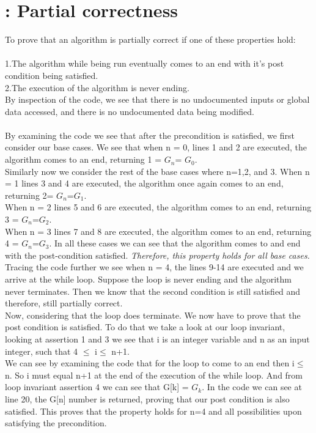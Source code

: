\documentclass{article}
\begin{document}
    \section{: Partial correctness}
    To prove that an algorithm is partially correct if one of these properties hold:\\
    \\1.The algorithm while being run eventually comes to an end with it’s post condition being satisfied.\\
    2.The execution of the algorithm is never ending. \\
    By inspection of the code, we see that there is no undocumented inputs or global data accessed, and there is no undocumented data being modified.\\
    \\By examining the code we see that after the precondition is satisfied, we first consider our base cases. We see that when n = 0, lines 1 and 2 are executed, the algorithm comes to an end, returning 1 = $G_{n}$= $G_{0}$.\\ Similarly now we consider the rest of the base cases where n=1,2, and 3. When n = 1 lines 3 and 4 are executed, the algorithm once again comes to an end, returning 2= $G_{n}$=$G_{1}$.\\ When n = 2 lines 5 and 6 are executed, the algorithm comes to an end, returning 3 = $G_{n}$=$G_{2}$. \\When n = 3 lines 7 and 8 are executed, the algorithm comes to an end, returning 4 = $G_{n}$=$G_{3}$. In all these cases we can see that the algorithm comes to and end with the post-condition satisfied. \textit{Therefore, this property holds for all base cases. }
    \\
    Tracing the code further we see when n = 4, the lines 9-14 are executed and we arrive at the while loop. Suppose the loop is never ending and the algorithm never terminates. Then we know that the second condition is still satisfied and therefore, still partially correct.\\
    Now, considering that the loop does terminate. We now have to prove that the post condition is satisfied. To do that we take a look at our loop invariant, looking at  assertion 1 and 3 we see that i is an integer variable and n as an input integer, such that  4 $\leq$ i$\leq$ n+1.\\
    We can see by examining the code that for the loop to come to an end then i$\leq$n. So i must equal n+1 at the end of the execution of the while loop. And from loop invariant assertion 4 we can see that G[k] = $G_{k}$. In the code we can see at line 20, the G[n] number is returned, proving that our post condition is also satisfied. This proves that the property holds for n=4 and all possibilities upon satisfying the precondition. \\
\end{document}
